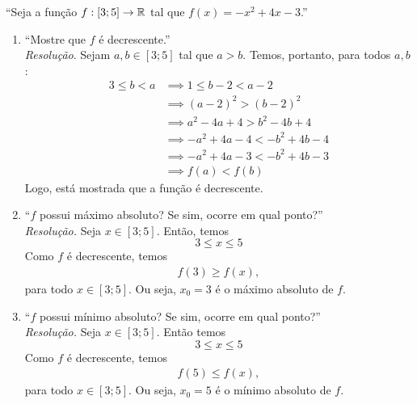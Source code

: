 \enquote{Seja a função $f: [3; 5] \rightarrow \mathbb R$ tal que $f(x) = -x^2 + 4x - 3$.}
\begin{enumerate}
    \item \enquote{Mostre que $f$ é decrescente.} \\
        \emph{Resolução}. Sejam $a, b \in [3;5]$ tal que $a > b$. Temos, portanto, para todos $a, b$:
        \begin{align*}
            3 \le b < a & \implies
            1 \le b - 2 < a - 2 \\ & \implies
            (a - 2)^2 > (b - 2)^2 \\ & \implies
            a^2 - 4a + 4 > b^2 - 4b + 4 \\ & \implies
            -a^2 + 4a - 4 < -b^2 + 4b - 4 \\ & \implies 
            -a^2 + 4a - 3 < -b^2 + 4b - 3 \\ & \implies
            f(a) < f(b)
        \end{align*} 
        Logo, está mostrada que a função é decrescente.
    \item \enquote{$f$ possui máximo absoluto? Se sim, ocorre em qual ponto?} \\
    \emph{Resolução.} Seja $x \in [3;5]$. Então, temos
    \begin{displaymath}
        3 \le x \le 5
    \end{displaymath} 
    Como $f$ é decrescente, temos
    \begin{align*}
        f(3) \ge f(x),
    \end{align*}
    para todo $x \in [3;5]$. Ou seja, $x_0 = 3$ é o máximo absoluto de $f$.
    \item \enquote{$f$ possui mínimo absoluto? Se sim, ocorre em qual ponto?} \\
    \emph{Resolução.} Seja $x \in [3;5]$. Então temos
    \begin{displaymath}
        3 \le x \le 5
    \end{displaymath} 
    Como $f$ é decrescente, temos
    \begin{align*}
        f(5) \le f(x),
    \end{align*}
    para todo $x \in [3;5]$. Ou seja, $x_0 = 5$ é o mínimo absoluto de $f$.
\end{enumerate}